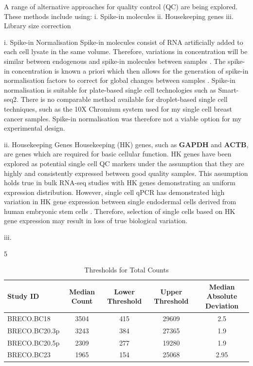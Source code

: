 A range of alternative approaches for quality control (QC) are being explored. These methods include using:
i. Spike-in molecules
ii. Housekeeping genes 
iii. Library size correction

i. Spike-in Normalisation
Spike-in molecules consist of RNA artificially added to each cell lysate in the same volume. Therefore, variations in concentration will be similar between endogenous and spike-in molecules between samples \cite{Katayama2013}. The spike-in concentration is known a priori which then allows for the generation of spike-in normalisation factors to correct for global changes between samples \cite{Katayama2013}. Spike-in normalisation is suitable for plate-based single cell technologies such as Smart-seq2. There is no comparable method available for droplet-based single cell techniques, such as the 10X Chromium system used for my single cell breast cancer samples. Spike-in normalisation was therefore not a viable option for my experimental design.

ii. Housekeeping Genes
Housekeeping (HK) genes, such as \textbf{GAPDH} and \textbf{ACTB}, are genes which are required for basic cellular function. HK genes have been explored as potential single cell QC markers under the assumption that they are highly and consistently expressed between good quality samples. This assumption holds true in bulk RNA-seq studies with HK genes demonstrating an uniform expression distribution. However, single cell qPCR has demonstrated high variation in HK gene expression between single endodermal cells derived from human embryonic stem cells \cite{Oyolu2012}. Therefore, selection of single cells based on HK gene expression may result in loss of true biological variation.

iii. 

\begin{table}[ht]
	\centering
	\small
	\renewcommand{\arraystretch}{1.4}
	{\columnwidth}{5}
	\begin{tabular}{|l| c | c | c | c |}
		\hline
		Study ID	&	Median Count & Lower Threshold & Upper Threshold & Median Absolute Deviation \\
		\hline
		BRECO.BC18 		& 3504 & 415 & 29609 & 2.5 	\\
		
		BRECO.BC20.3p 	& 3243 & 384 & 27365 & 1.9 		\\
		
		BRECO.BC20.5p 	& 2309 & 277 & 19280 & 1.9 		\\
		
		BRECO.BC23 		& 1965 & 154 & 25068 & 2.95\\
		\hline
	\end{tabular}
	\caption{Thresholds for Total Counts}
	\label{tab: qc_thesholds_counts}
\end{table}


